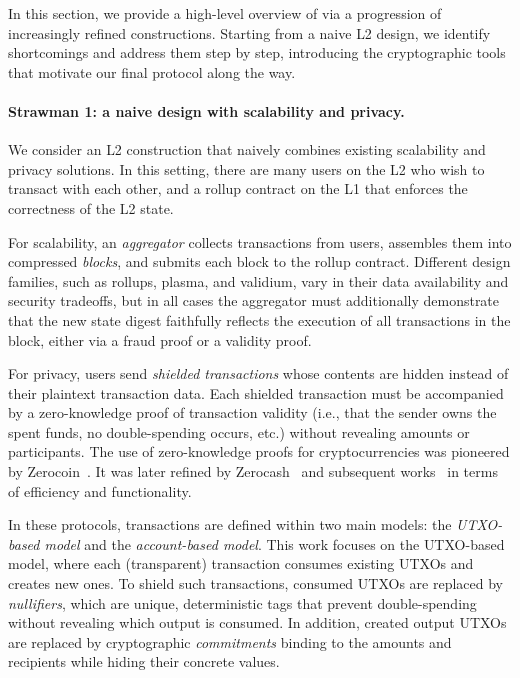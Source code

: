 
In this section, we provide a high-level overview of \Protocol via a progression of increasingly refined constructions.
Starting from a naive \ac{L2} design, we identify shortcomings and address them step by step, introducing the cryptographic tools that motivate our final protocol along the way.

\paragraph{Strawman 1: a naive design with scalability and privacy.}
We consider an \ac{L2} construction that naively combines existing scalability and privacy solutions.
In this setting, there are many users on the \ac{L2} who wish to transact with each other, and a rollup contract on the \ac{L1} that enforces the correctness of the \ac{L2} state.

For scalability, an \textit{aggregator} collects transactions from users, assembles them into compressed \textit{blocks}, and submits each block to the rollup contract.
Different design families, such as rollups, plasma, and validium, vary in their data availability and security tradeoffs, but in all cases the aggregator must additionally demonstrate that the new state digest faithfully reflects the execution of all transactions in the block, either via a fraud proof or a validity proof.

For privacy, users send \textit{shielded transactions} whose contents are hidden instead of their plaintext transaction data.
Each shielded transaction must be accompanied by a zero-knowledge proof of transaction validity (i.e., that the sender owns the spent funds, no double-spending occurs, etc.) without revealing amounts or participants.
The use of zero-knowledge proofs for cryptocurrencies was pioneered by Zerocoin~\cite{SP:MGGR13}. It was later refined by Zerocash~\cite{SP:BCGGMT14} and subsequent works~\cite{AC:FMMO19,FC:BAZB20,SP:Diamond21,ESORICS:ChaBal21,ASIACCS:CamHal22,SP:GKPH24,AC:MadSca25,EPRINT:SKKK25} in terms of efficiency and functionality.

In these protocols, transactions are defined within two main models: the \textit{UTXO-based model} and the \textit{account-based model}.
This work focuses on the \ac{UTXO}-based model, where each (transparent) transaction consumes existing \acp{UTXO} and creates new ones.
To shield such transactions, consumed \acp{UTXO} are replaced by \textit{nullifiers}, which are unique, deterministic tags that prevent double-spending without revealing which output is consumed.
In addition, created output \acp{UTXO} are replaced by cryptographic \textit{commitments} binding to the amounts and recipients while hiding their concrete values.

